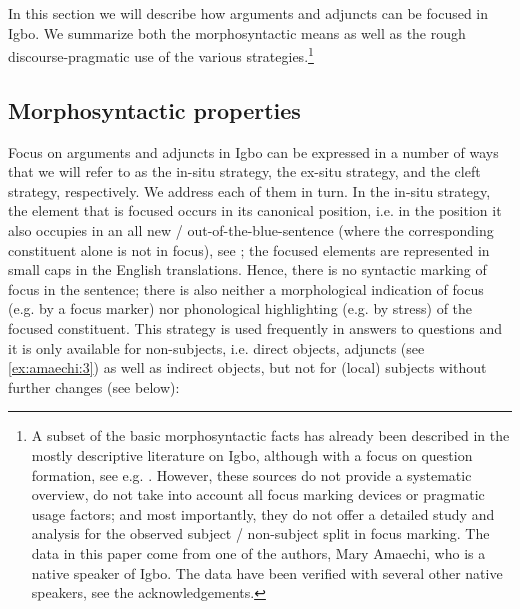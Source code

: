 \documentclass[output=paper,colorlinks,citecolor=brown]{langscibook}
\begin{document}
In this section we will describe how arguments and adjuncts can be focused in Igbo. We summarize both the morphosyntactic means as well as the rough discourse-pragmatic use of the various strategies.\footnote{A subset of the basic morphosyntactic facts has already been described in the mostly descriptive literature on Igbo, although with a focus on question formation, see e.g. \citet{Goldsmith1981, Ikekeonwu1987, Uwalaka1991, Mmaduagwu2012, Nwankwegu2015}. However, these sources do not provide a systematic overview, do not take into account all focus marking devices or pragmatic usage factors; and most importantly, they do not offer a detailed study and analysis for the observed  subject / non-subject split in focus marking. The data in this paper come from one of the authors, Mary Amaechi, who is a native speaker of Igbo. The data have been verified with several other native speakers, see the acknowledgements.}

\subsection{Morphosyntactic properties}\label{sec:amaechi:2.1}

Focus on arguments and adjuncts in Igbo can be expressed in a number of ways that we will refer to as the in-situ strategy, the ex-situ strategy, and the cleft strategy, respectively. We address each of them in turn. In the in-situ strategy, the element that is focused occurs in its canonical position, i.e. in the position it also occupies in an all new / out-of-the-blue-sentence (where the corresponding constituent alone is not in focus), see ; the focused elements are represented in small caps in the English translations. Hence, there is no syntactic marking of focus in the sentence; there is also neither a morphological indication of focus (e.g. by a focus marker) nor phonological highlighting (e.g. by stress) of the focused constituent. This strategy is used frequently in answers to questions and it is only available for non-subjects, i.e. direct objects, adjuncts (see \ref{ex:amaechi:3}) as well as indirect objects, but not for (local) subjects without further changes (see below):

\newpage
\end{document}
